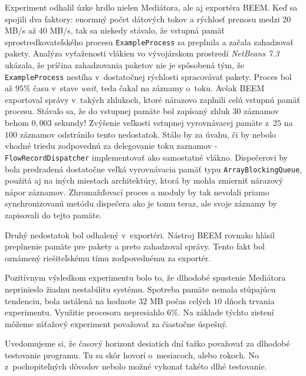 Experiment odhalil úzke hrdlo nielen Mediátora, ale aj exportéra BEEM. Keď sa spojili dva faktory: 
enormný počet dátových tokov a rýchlosť prenosu medzi $20$ MB/s až $40$ MB/s, tak sa niekedy stávalo, že 
vstupná pamäť sprostredkovateľského procesu \verb|ExampleProcess| sa preplnila a začala zahadzovať pakety. 
Analýza vyťaženosti vlákien vo vývojárskom prostredí \emph{NetBeans 7.3} ukázala, že príčina zahadzovania 
paketov nie je spôsobená tým, že \verb|ExampleProcess| nestíha v~dostatočnej rýchlosti spracovávať pakety.
Proces bol až $95\%$ času v~stave \emph{wait}, teda čakal na záznamy o~toku. Avšak BEEM exportoval správy
v~takých zhlukoch, ktoré nárazovo zaplnili celú vstupnú pamäť procesu. Stávalo sa, že do vstupnej
pamäte bol zapísaný zhluk 30 záznamov behom $0,003$ sekundy!
Zvýšenie veľkosti vstupnej vyrovnávacej pamäte z~$25$ na $100$ záznamov odstránilo tento nedostatok. Stálo by za úvahu,
či by nebolo vhodné triedu zodpovednú za delegovanie toku zaznamov - \verb|FlowRecordDispatcher| 
implementovať ako samostatné vlákno. Dispečerovi by bola predradená dostatočne veľká vyrovnávacia pamäť 
typu \verb|ArrayBlockingQueue|, použitá aj na iných miestach architektúry, ktorá by mohla zmierniť 
nárazový nápor záznamov. Zhromažďovací proces a moduly by tak nevolali priamo synchronizovanú metódu
dispečera ako je tomu teraz, ale svoje záznamy by zapisovali do tejto pamäte.

Druhý nedostatok bol odhalený v~exportéri. Nástroj BEEM rovnako hlásil preplnenie pamäte pre pakety a 
preto zahadzoval správy. Tento fakt bol oznámený riešiteľskému tímu zodpovednému za exportér.

Pozitívnym výsledkom experimentu bolo to, že dlhodobé spustenie Mediátora neprinieslo žiadnu nestabilitu 
systému. Spotreba pamäte nemala stúpajúcu tendenciu, bola ustálená na hodnote $32$ MB počas celých 
$10$ dňoch trvania experimentu. Využitie procesora nepresiahlo $6\%$. Na základe týchto zistení môžeme záťažový 
experiment považovať za čiastočne úspešný.

Uvedomujeme si, že časový horizont
desiatich dní ťažko považovať za dlhodobé testovanie programu. Tu sa skôr hovorí o~mesiacoch, alebo
rokoch. No z~pochopiteľných dôvodov nebolo možné vykonať takéto dlhé testovanie.




























